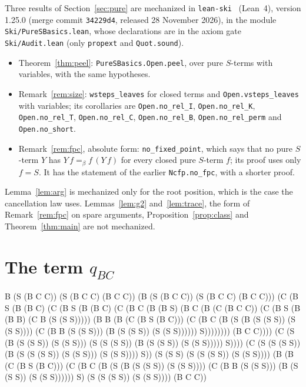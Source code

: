 \documentclass[11pt]{amsart}
\theoremstyle{definition}
\newcommand{\conv}{=_\beta}
\begin{document}
Three results of Section~\ref{sec:pure} are mechanized in \texttt{lean-ski}~\citep{leanski} (Lean~4),
version 1.25.0 (merge commit \texttt{34229d4}, released 28 November 2026), in the module \texttt{Ski/PureSBasics.lean},
whose declarations are in the axiom gate \texttt{Ski/Audit.lean} (only \texttt{propext} and
\texttt{Quot.sound}).
\begin{itemize}
\item Theorem~\ref{thm:peel}: \texttt{PureSBasics.Open.peel}, over pure $S$-terms with variables, with
the same hypotheses.
\item Remark~\ref{rem:size}: \texttt{wsteps\_leaves} for closed terms and \texttt{Open.vsteps\_leaves}
with variables; its corollaries are \texttt{Open.no\_rel\_I}, \texttt{Open.no\_rel\_K},
\texttt{Open.no\_rel\_T}, \texttt{Open.no\_rel\_C}, \texttt{Open.no\_rel\_B}, \texttt{Open.no\_rel\_perm}
and \texttt{Open.no\_short}.
\item Remark~\ref{rem:fpc}, absolute form: \texttt{no\_fixed\_point}, which says that no pure $S$-term $Y$
has $Y\,f\conv f\,(Y\,f)$ for every closed pure $S$-term $f$; its proof uses only $f=S$. It has the
statement of the earlier \texttt{Ncfp.no\_fpc}, with a shorter proof.
\end{itemize}
Lemma~\ref{lem:arg} is mechanized only for the root position, which is the case the cancellation law
uses. Lemmas~\ref{lem:g2} and~\ref{lem:trace}, the form of Remark~\ref{rem:fpc} on spare arguments,
Proposition~\ref{prop:class} and Theorem~\ref{thm:main} are not mechanized.

\appendix
\section{The term \texorpdfstring{$q_{BC}$}{qBC}}\label{app:q}
{\small\raggedright\ttfamily
B (S (B C C)) (S (B C C) (B C C)) (B (S (B C C)) (S (B C C) (B C C))) (C (B S (B (B C) (C (B S (B (B C)
(C (B C (B (B S) (B C (B (C (B C C)) (C (B S (B (B B) (C B (S (S S))))) (B B (B (C (B S (B C))) (C (B C
(B (S (B (S (S S)) (S (S S)))) (C (B B (S (S S))) (B (S (S S)) (S (S S)))))) S)))))))) (B C C)))) (C (S
(B (S (S S)) (S (S S))) (S (S (S S)) (B (S (S S)) (S (S S))))) S)))) (C (S (S (S S)) (B (S (S (S S))
(S (S S))) (S (S S)))) S)) (S (S S) (S (S (S S)) (S (S S)))) (B (B (C (B S (B C))) (C (B C (B (S (B (S
(S S)) (S (S S)))) (C (B B (S (S S))) (B (S (S S)) (S (S S)))))) S) (S (S (S S)) (S (S S)))) (B C C))
\par}



\end{document}
